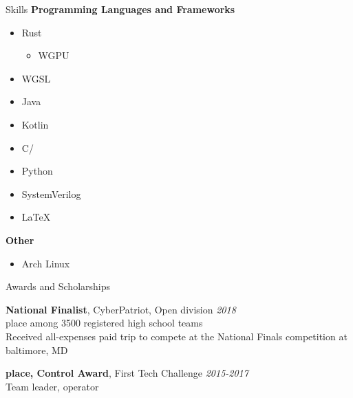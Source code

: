 	\begin{rSection}{Skills}
		{\bf Programming Languages and Frameworks }
		\begin{multicols}{3}
			\begin{itemize}
				\item Rust
					\begin{itemize}
						\item WGPU
					\end{itemize}
				\item WGSL
				\item Java
				\item Kotlin
				\item C/\CC
				\item Python
				\item SystemVerilog
				\item \LaTeX
			\end{itemize}
		\end{multicols}

		{\bf Other }
		\begin{multicols}{2}
			\begin{itemize}
				\item Arch Linux
			\end{itemize}
		\end{multicols}

	\end{rSection}

	\begin{rSection}{Awards and Scholarships} 

		{\bf National Finalist}{, CyberPatriot, Open division} \hfill{\em 2018} \\
		 place among 3500 registered high school teams \\
		Received all-expenses paid trip to compete at the National Finals competition at baltimore, MD
		
		{\bf {} place, Control Award}{, First Tech Challenge} \hfill{\em 2015-2017} \\
		Team leader,  operator
		
	\end{rSection}




